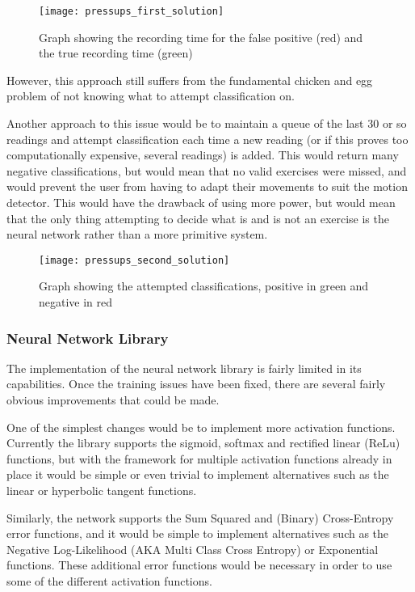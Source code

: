 \documentclass[a4paper]{article}
\begin{document}
\begin{figure}[H]
    \centering
        \texttt{[image: pressups\_first\_solution]}
        \caption{Graph showing the recording time for the false positive (red) and the true recording time (green)}
        \label{fig:pu_first_solution}
\end{figure}

However, this approach still suffers from the fundamental chicken and egg problem of not knowing what to attempt classification on.

Another approach to this issue would be to maintain a queue of the last 30 or so readings and attempt classification each time a new reading (or if this proves too computationally expensive, several readings) is added. 
This would return many negative classifications, but would mean that no valid exercises were missed, and would prevent the user from having to adapt their movements to suit the motion detector. This would have the drawback of using more power, but would mean that the only thing attempting to decide what is and is not an exercise is the neural network rather than a more primitive system.

\begin{figure}[H]
    \centering
        \texttt{[image: pressups\_second\_solution]}
        \caption{Graph showing the attempted classifications, positive in green and negative in red}
        \label{fig:pu_second_solution}
\end{figure}

\subsubsection{Neural Network Library}

The implementation of the neural network library is fairly limited in its capabilities. Once the training issues have been fixed, there are several fairly obvious improvements that could be made.

One of the simplest changes would be to implement more activation functions. Currently the library supports the sigmoid, softmax  and rectified linear (ReLu) functions, but with the framework for multiple activation functions already in place it would be simple or even trivial to implement alternatives such as the linear or hyperbolic tangent functions.

Similarly, the network supports the Sum Squared and (Binary) Cross-Entropy error functions, and it would be simple to implement alternatives such as the Negative Log-Likelihood (AKA Multi Class Cross Entropy) or Exponential functions. These additional error functions would be necessary in order to use some of the different activation functions. 
\end{document}
